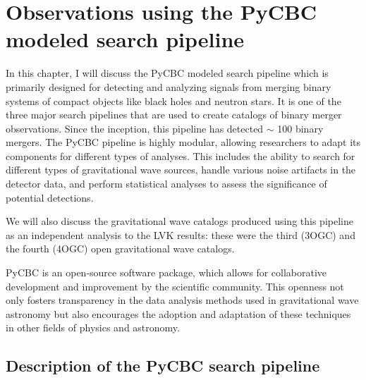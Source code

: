\chapter{Observations using the PyCBC modeled search pipeline}


In this chapter, I will discuss the PyCBC modeled search pipeline which is primarily designed for detecting and analyzing signals from merging binary systems of compact objects like black holes and neutron stars. It is one of the three major search pipelines that are used to create catalogs of binary merger observations. Since the inception, this pipeline has detected $\sim$ 100 binary mergers. The PyCBC pipeline is highly modular, allowing researchers to adapt its components for different types of analyses. This includes the ability to search for different types of gravitational wave sources, handle various noise artifacts in the detector data, and perform statistical analyses to assess the significance of potential detections.

We will also discuss the gravitational wave catalogs produced using this pipeline as an independent analysis to the LVK results: these were the third (3OGC) and the fourth (4OGC) open gravitational wave catalogs. 

PyCBC is an open-source software package, which allows for collaborative development and improvement by the scientific community. This openness not only fosters transparency in the data analysis methods used in gravitational wave astronomy but also encourages the adoption and adaptation of these techniques in other fields of physics and astronomy.

\section{Description of the PyCBC search pipeline}

